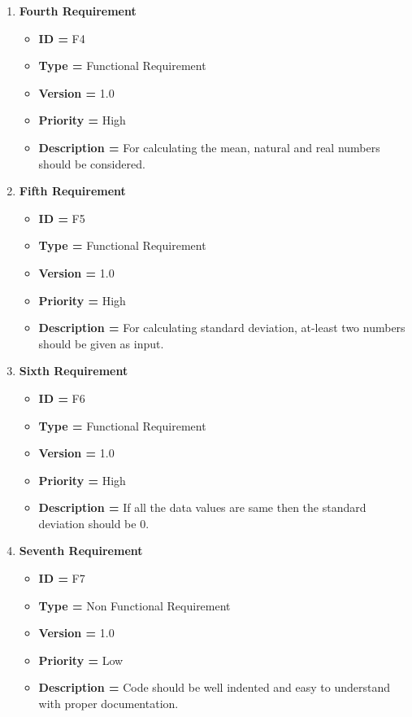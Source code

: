 \documentclass[a4paper, 12pt]{article}
\begin{document}
\begin{enumerate}[noitemsep]
        \newpage
        \item \textbf{Fourth Requirement}
        \begin{itemize}[noitemsep]
            \item \textbf{ID = } F4
            \item\textbf{Type = } Functional Requirement
            \item\textbf{Version = } 1.0
            \item\textbf{Priority = } High
            \item\textbf{Description = }   For calculating the mean, natural and real numbers should be considered.
        \end{itemize}
        \item \textbf{Fifth Requirement}
        \begin{itemize}[noitemsep]
            \item \textbf{ID = } F5
            \item\textbf{Type = } Functional Requirement
            \item\textbf{Version = } 1.0
            \item\textbf{Priority = } High
            \item\textbf{Description = }   For calculating standard deviation, at-least two numbers should be given as input.
        \end{itemize}
        \item \textbf{Sixth Requirement}
        \begin{itemize}[noitemsep]
            \item \textbf{ID = } F6
            \item\textbf{Type = } Functional Requirement
            \item\textbf{Version = } 1.0
            \item\textbf{Priority = } High
            \item\textbf{Description = }   If all the data values are same then the standard deviation should be 0.
        \end{itemize}
        \item \textbf{Seventh Requirement}
        \begin{itemize}[noitemsep]
            \item \textbf{ID = } F7
            \item\textbf{Type = } Non Functional Requirement
            \item\textbf{Version = } 1.0
            \item\textbf{Priority = } Low
            \item\textbf{Description = }   Code should be well indented and easy to understand with proper documentation. 
        \end{itemize}
        \newpage
    \end{enumerate}
\end{document}
